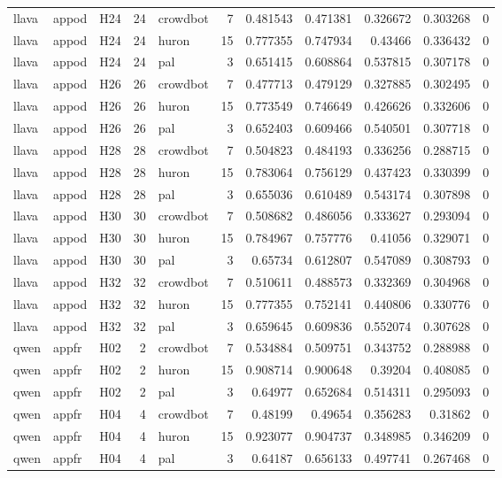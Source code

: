 \begin{longtable}{lllrlrrrrrr}
llava & appod & H24 & 24 & crowdbot & 7 & 0.481543 & 0.471381 & 0.326672 & 0.303268 & 0 \\
llava & appod & H24 & 24 & huron & 15 & 0.777355 & 0.747934 & 0.43466 & 0.336432 & 0 \\
llava & appod & H24 & 24 & pal & 3 & 0.651415 & 0.608864 & 0.537815 & 0.307178 & 0 \\
llava & appod & H26 & 26 & crowdbot & 7 & 0.477713 & 0.479129 & 0.327885 & 0.302495 & 0 \\
llava & appod & H26 & 26 & huron & 15 & 0.773549 & 0.746649 & 0.426626 & 0.332606 & 0 \\
llava & appod & H26 & 26 & pal & 3 & 0.652403 & 0.609466 & 0.540501 & 0.307718 & 0 \\
llava & appod & H28 & 28 & crowdbot & 7 & 0.504823 & 0.484193 & 0.336256 & 0.288715 & 0 \\
llava & appod & H28 & 28 & huron & 15 & 0.783064 & 0.756129 & 0.437423 & 0.330399 & 0 \\
llava & appod & H28 & 28 & pal & 3 & 0.655036 & 0.610489 & 0.543174 & 0.307898 & 0 \\
llava & appod & H30 & 30 & crowdbot & 7 & 0.508682 & 0.486056 & 0.333627 & 0.293094 & 0 \\
llava & appod & H30 & 30 & huron & 15 & 0.784967 & 0.757776 & 0.41056 & 0.329071 & 0 \\
llava & appod & H30 & 30 & pal & 3 & 0.65734 & 0.612807 & 0.547089 & 0.308793 & 0 \\
llava & appod & H32 & 32 & crowdbot & 7 & 0.510611 & 0.488573 & 0.332369 & 0.304968 & 0 \\
llava & appod & H32 & 32 & huron & 15 & 0.777355 & 0.752141 & 0.440806 & 0.330776 & 0 \\
llava & appod & H32 & 32 & pal & 3 & 0.659645 & 0.609836 & 0.552074 & 0.307628 & 0 \\
qwen & appfr & H02 & 2 & crowdbot & 7 & 0.534884 & 0.509751 & 0.343752 & 0.288988 & 0 \\
qwen & appfr & H02 & 2 & huron & 15 & 0.908714 & 0.900648 & 0.39204 & 0.408085 & 0 \\
qwen & appfr & H02 & 2 & pal & 3 & 0.64977 & 0.652684 & 0.514311 & 0.295093 & 0 \\
qwen & appfr & H04 & 4 & crowdbot & 7 & 0.48199 & 0.49654 & 0.356283 & 0.31862 & 0 \\
qwen & appfr & H04 & 4 & huron & 15 & 0.923077 & 0.904737 & 0.348985 & 0.346209 & 0 \\
qwen & appfr & H04 & 4 & pal & 3 & 0.64187 & 0.656133 & 0.497741 & 0.267468 & 0 \\

\end{longtable}
